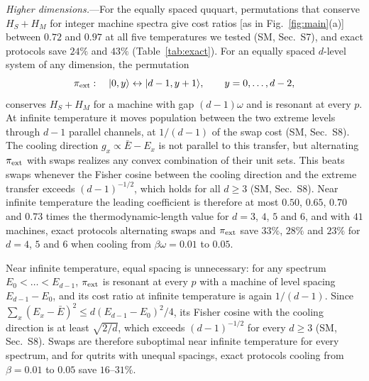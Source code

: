 \documentclass[aps,prl,reprint,superscriptaddress,amsmath,amssymb]{revtex4-2}
\begin{document}
\emph{Higher dimensions.}---For the equally spaced ququart, permutations that conserve $H_S+H_M$ for integer machine
spectra give cost ratios [as in Fig.~\ref{fig:main}(a)] between $0.72$ and $0.97$ at all five temperatures we tested
(SM, Sec.~S7), and exact protocols save $24\%$ and $43\%$ (Table~\ref{tab:exact}). For an equally spaced $d$-level
system of any dimension, the permutation
\begin{equation}
\pi_{\rm ext}:\quad |0,y\rangle\leftrightarrow|d-1,y+1\rangle,\qquad y=0,\dots,d-2,
\label{eq:piext}
\end{equation}
conserves $H_S+H_M$ for a machine with gap $(d-1)\omega$ and is resonant at every $p$. At infinite temperature it moves
population between the two extreme levels through $d-1$ parallel channels, at $1/(d-1)$ of the swap cost (SM,
Sec.~S8). The cooling direction $g_x\propto\bar E-E_x$ is not parallel to this transfer, but alternating $\pi_{\rm ext}$
with swaps realizes any convex combination of their unit sets. This beats swaps whenever the Fisher cosine between the
cooling direction and the extreme transfer exceeds $(d-1)^{-1/2}$, which holds for all $d\geq3$ (SM, Sec.~S8). Near
infinite temperature the leading coefficient is therefore at most $0.50$, $0.65$, $0.70$ and $0.73$ times the
thermodynamic-length value for $d=3$, $4$, $5$ and $6$, and with $41$ machines, exact protocols alternating swaps and
$\pi_{\rm ext}$ save $33\%$, $28\%$ and $23\%$ for $d=4$, $5$ and $6$ when cooling from $\beta\omega=0.01$ to $0.05$.

Near infinite temperature, equal spacing is unnecessary: for any spectrum $E_0<\dots<E_{d-1}$, $\pi_{\rm ext}$ is
resonant at every $p$ with a machine of level spacing $E_{d-1}-E_0$, and its cost ratio at infinite temperature is
again $1/(d-1)$. Since $\sum_x(E_x-\bar E)^2\le d(E_{d-1}-E_0)^2/4$, its Fisher cosine with the cooling direction is at
least $\sqrt{2/d}$, which exceeds $(d-1)^{-1/2}$ for every $d\geq3$ (SM, Sec.~S8). Swaps are therefore suboptimal near
infinite temperature for every spectrum, and for qutrits with unequal spacings, exact protocols cooling from
$\beta=0.01$ to $0.05$ save $16$--$31\%$.
\end{document}
